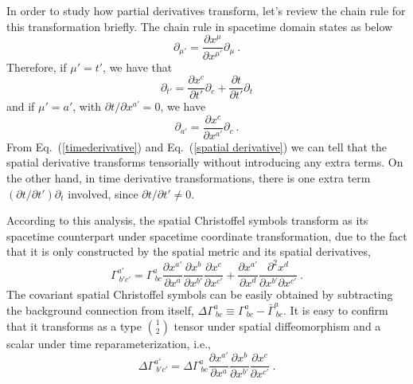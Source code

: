 In order to study how partial derivatives transform, let's review the chain rule for this transformation briefly. The chain rule in spacetime domain states as below
\begin{equation}
\partial_{\mu'} = \frac{\partial x^{\mu}}{\partial x^{\mu'}}\partial_{\mu} \ .
\end{equation}
Therefore, if $\mu' = t'$, we have that
\begin{equation}\label{timederivative}
\partial_{t'} = \frac{\partial x^{c}}{\partial t'}\partial_{c} + \frac{\partial t}{\partial t'}\partial_{t}
\end{equation}
and if $\mu' = a'$, with $\partial t/\partial x^{a'} = 0$, we have
\begin{equation}\label{spatial derivative}
\partial_{a'} = \frac{\partial x^{c}}{\partial x^{a'}}\partial_{c} \ .
\end{equation}
From Eq.~(\ref{timederivative}) and Eq.~(\ref{spatial derivative}) we can tell that the spatial derivative transforms tensorially without introducing any extra terms. On the other hand, in time derivative transformations, there is one extra term $\left(\partial t/\partial t'\right)\partial_{t}$ involved, since $\partial t/\partial t' \ne 0$. 

According to this analysis, the spatial Christoffel symbols transform as its spacetime counterpart under spacetime coordinate transformation, due to the fact that it is only constructed by the spatial metric and its spatial derivatives, 
\begin{equation}
\Gamma^{a'}_{~b'c'} = \Gamma^{a}_{~bc}\frac{\partial x^{a'}}{\partial x^{a}}\frac{\partial x^{b}}{\partial x^{b'}}\frac{\partial x^{c}}{\partial x^{c'}} + \frac{\partial x^{a'}}{\partial x^{d}}\frac{\partial^{2} x^{d}}{\partial x^{b'}\partial x^{c'}} \ .
\end{equation}
The covariant spatial Christoffel symbols can be easily obtained by subtracting the background connection from itself, $\Delta \Gamma^{a}_{~bc} \equiv \Gamma^{a}_{~bc} - {\bar \Gamma}^{a}_{~bc}$. It is easy to confirm that it transforms as a type $1 \choose 2$ tensor under spatial diffeomorphism and a scalar under time reparameterization, i.e.,  
\begin{equation}
	\Delta \Gamma^{a'}_{~b'c'} = \Delta \Gamma^{a}_{~bc}\frac{\partial x^{a'}}{\partial x^{a}}\frac{\partial x^{b}}{\partial x^{b'}}\frac{\partial x^{c}}{\partial x^{c'}} \ .	
\end{equation}

